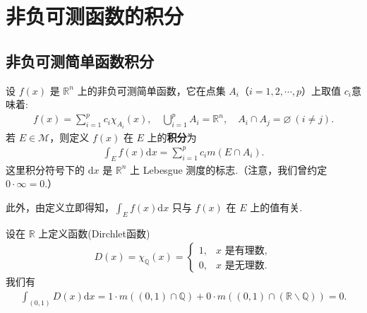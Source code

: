 \documentclass[../../main.tex]{subfiles}
\begin{document}
\section{非负可测函数的积分}

\subsection{非负可测简单函数积分}

\begin{definition}
设 \(f(x)\) 是 \(\mathbb{R}^n\) 上的非负可测简单函数，它在点集 \(A_i\)（\(i = 1,2,\cdots,p\)）上取值 \(c_i\)意味着:
\begin{align*}
f(x)=\sum_{i = 1}^{p}c_i\chi_{A_i}(x),\quad  \bigcup_{i = 1}^{p}A_i=\mathbb{R}^n,\quad A_i\cap A_j=\varnothing\ (i\neq j).
\end{align*}
若 \(E\in\mathscr{M}\)，则定义 \(f(x)\) 在 \(E\) 上的\textbf{积分}为
\begin{align*}
\int_{E}f(x)\mathrm{d}x=\sum_{i = 1}^{p}c_im(E\cap A_i).
\end{align*}
这里积分符号下的 \(\mathrm{d}x\) 是 \(\mathbb{R}^n\) 上 Lebesgue 测度的标志.（注意，我们曾约定 \(0\cdot\infty = 0\).） 
\end{definition}
\begin{remark}
此外，由定义立即得知，$\int_{E}f(x)\mathrm{d}x$ 只与 \(f(x)\) 在 \(E\) 上的值有关. 
\end{remark}

\begin{example}
设在 \(\mathbb{R}\) 上定义函数(Dirchlet函数)
\begin{align*}
D(x)=\chi_{\mathbb{Q}}(x)=\begin{cases}
1, & x\text{ 是有理数},\\
0, & x\text{ 是无理数}.
\end{cases}
\end{align*}
我们有
\begin{align*}
\int_{(0,1)}{D(x)\mathrm{d}x}=1\cdot m\left( \left( 0,1 \right) \cap \mathbb{Q} \right) +0\cdot m\left( \left( 0,1 \right) \cap \left( \mathbb{R} \backslash \mathbb{Q} \right) \right) =0.
\end{align*} 
\end{example}
\end{document}
